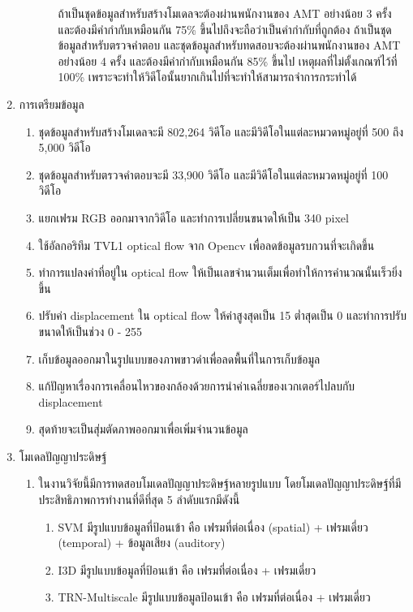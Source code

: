 \begin{enumerate}
\begin{enumerate}
\begin{enumerate}
		ถ้าเป็นชุดข้อมูลสำหรับสร้างโมเดลจะต้องผ่านพนักงานของ AMT อย่างน้อย 3 ครั้ง และต้องมีคำกำกับเหมือนกัน 75\% ขึ้นไปถึงจะถือว่าเป็นคำกำกับที่ถูกต้อง 
		ถ้าเป็นชุดข้อมูลสำหรับตรวจคำตอบ และชุดข้อมูลสำหรับทดสอบจะต้องผ่านพนักงานของ AMT อย่างน้อย 4 ครั้ง และต้องมีคำกำกับเหมือนกัน 85\% ขึ้นไป 
		เหตุผลที่ไม่ตั้งเกณฑ์ไว้ที่ 100\% เพราะจะทำให้วิดีโอนั้นยากเกินไปที่จะทำให้สามารถจำการกระทำได้	
	\end{enumerate}
\end{enumerate}
	\item การเตรียมข้อมูล
		\begin{enumerate}
			\item ชุดข้อมูลสำหรับสร้างโมเดลจะมี 802,264 วิดีโอ และมีวิดีโอในแต่ละหมวดหมู่อยู่ที่ 500 ถึง 5,000 วิดีโอ
			\item ชุดข้อมูลสำหรับตรวจคำตอบจะมี 33,900 วิดีโอ และมีวิดีโอในแต่ละหมวดหมู่อยู่ที่ 100 วิดีโอ
			\item แยกเฟรม RGB ออกมาจากวิดีโอ และทำการเปลี่ยนขนาดให้เป็น 340  pixel
			\item ใช้อัลกอริทึม TVL1 optical flow จาก Opencv เพื่อลดข้อมูลรบกวนที่จะเกิดขึ้น
			\item ทำการแปลงค่าที่อยู่ใน optical flow ให้เป็นเลขจำนวนเต็มเพื่อทำให้การคำนวณนั้นเร็วยิ่งขึ้น
			\item ปรับค่า displacement ใน optical flow ให้ค่าสูงสุดเป็น 15 ต่ำสุดเป็น 0 และทำการปรับขนาดให้เป็นช่วง 0 - 255
			\item เก็บข้อมูลออกมาในรูปแบบของภาพขาวดำเพื่อลดพื้นที่ในการเก็บข้อมูล
			\item แก้ปัญหาเรื่องการเคลื่อนไหวของกล้องด้วยการนำค่าเฉลี่ยของเวกเตอร์ไปลบกับ displacement
			\item สุดท้ายจะเป็นสุ่มตัดภาพออกมาเพื่อเพิ่มจำนวนข้อมูล
		\end{enumerate}
	\item {โมเดลปัญญาประดิษฐ์}
	\begin{enumerate}
		\item ในงานวิจัยนี้มีการทดสอบโมเดลปัญญาประดิษฐ์หลายรูปแบบ โดยโมเดลปัญญาประดิษฐ์ที่มีประสิทธิภาพการทำงานที่ดีที่สุด 5 ลำดับแรกมีดังนี้
			\begin{enumerate}
				\item SVM มีรูปแบบข้อมูลที่ป้อนเข้า คือ เฟรมที่ต่อเนื่อง (spatial) + เฟรมเดี่ยว (temporal) + ข้อมูลเสียง (auditory) 	
				\item I3D มีรูปแบบข้อมูลที่ป้อนเข้า คือ เฟรมที่ต่อเนื่อง + เฟรมเดี่ยว
				\item TRN-Multiscale มีรูปแบบข้อมูลป้อนเข้า คือ เฟรมที่ต่อเนื่อง + เฟรมเดี่ยว

\end{enumerate}
\end{enumerate}
\end{enumerate}
